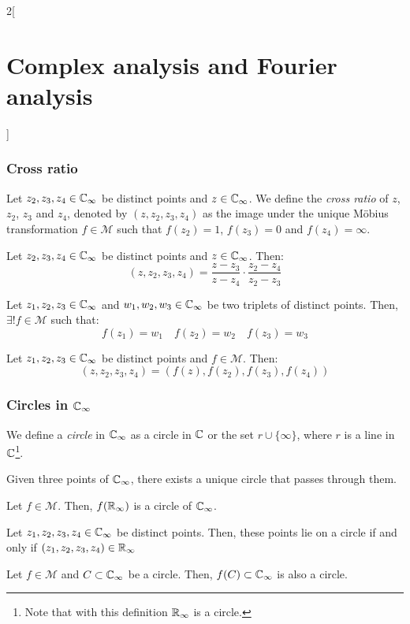 \documentclass[../../../main.tex]{subfiles}
\begin{document}
\begin{multicols}{2}[\section{Complex analysis and Fourier analysis}]
  \subsubsection{Cross ratio}
  \begin{definition}
    Let $z_2,z_3,z_4\in\mathbb{C}_\infty$ be distinct points and $z\in\mathbb{C}_\infty$. We define the \emph{cross ratio} of $z$, $z_2$, $z_3$ and $z_4$, denoted by $(z,z_2,z_3,z_4)$ as the image under the unique Möbius transformation $f\in\mathcal{M}$ such that $f(z_2)=1$, $f(z_3)=0$ and $f(z_4)=\infty$.
  \end{definition}
  \begin{proposition}
    Let $z_2,z_3,z_4\in\mathbb{C}_\infty$ be distinct points and $z\in\mathbb{C}_\infty$. Then: $$(z,z_2,z_3,z_4)=\frac{z-z_3}{z-z_4}\cdot\frac{z_2-z_4}{z_2-z_3}$$
  \end{proposition}
  \begin{corollary}
    Let $z_1,z_2,z_3\in\mathbb{C}_\infty$ and $w_1,w_2,w_3\in\mathbb{C}_\infty$ be two triplets of distinct points. Then, $\exists! f\in\mathcal{M}$ such that: $$f(z_1)=w_1\quad f(z_2)=w_2\quad f(z_3)=w_3$$
  \end{corollary}
  \begin{theorem}
    Let $z_1,z_2,z_3\in\mathbb{C}_\infty$ be distinct points and $f\in\mathcal{M}$. Then: $$(z,z_2,z_3,z_4)=(f(z),f(z_2),f(z_3),f(z_4))$$
  \end{theorem}
  \subsubsection{Circles in \texorpdfstring{$\mathbb{C}_\infty$}{Coo}}
  \begin{definition}
    We define a \emph{circle} in $\mathbb{C}_\infty$ as a circle in $\mathbb{C}$ or the set $r\cup\{\infty\}$, where $r$ is a line in $\mathbb{C}$\footnote{Note that with this definition $\mathbb{R}_\infty$ is a circle.}.
  \end{definition}
  \begin{proposition}
    Given three points of $\mathbb{C}_\infty$, there exists a unique circle that passes through them.
  \end{proposition}
  \begin{proposition}
    Let $f\in\mathcal{M}$. Then, $f(\mathbb{R}_\infty)$ is a circle of $\mathbb{C}_\infty$.
  \end{proposition}
  \begin{proposition}
    Let $z_1,z_2,z_3,z_4\in\mathbb{C}_\infty$ be distinct points. Then, these points lie on a circle if and only if $(z_1,z_2,z_3,z_4)\in\mathbb{R}_\infty$
  \end{proposition}
  \begin{theorem}
    Let $f\in\mathcal{M}$ and $C\subset\mathbb{C}_\infty$ be a circle. Then, $f(C)\subset\mathbb{C}_\infty$ is also a circle.
  \end{theorem}

\end{multicols}
\end{document}
